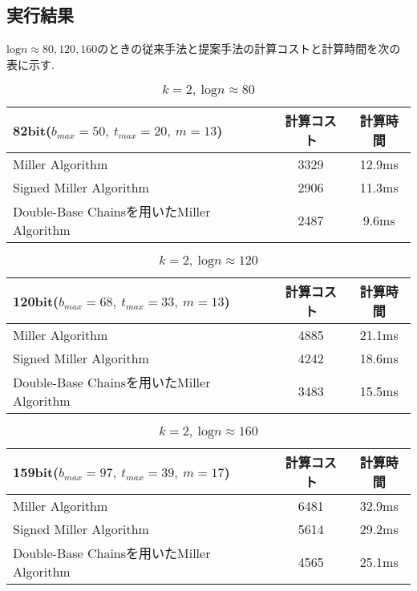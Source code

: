\subsection{実行結果}
$\mbox{log}n \approx 80,120,160$のときの従来手法と提案手法の計算コストと計算時間を次の表に示す. \\
\begin{table}[htb]
 \begin{center}
  \begin{tabular}{|l|c|c|}
  \hline
  82bit($b_{max} = 50,\ t_{max} = 20,\ m = 13$) & 計算コスト& 計算時間\\
  \hline
  Miller Algorithm & 3329 & 12.9ms \\
  \hline
  Signed Miller Algorithm & 2906 & 11.3ms \\
  \hline
  Double-Base Chainsを用いたMiller Algorithm & 2487 & 9.6ms \\
  \hline
  \end{tabular}
 \end{center}
 \caption{$k=2,\ \mbox{log}n \approx 80$}
\end{table}
\begin{table}[htb]
 \begin{center}
  \begin{tabular}{|l|c|c|}
  \hline
  120bit($b_{max} = 68,\ t_{max} = 33,\ m = 13$) & 計算コスト& 計算時間\\
  \hline
  Miller Algorithm & 4885 & 21.1ms \\
  \hline
  Signed Miller Algorithm & 4242 & 18.6ms \\
  \hline
  Double-Base Chainsを用いたMiller Algorithm & 3483 & 15.5ms \\
  \hline
  \end{tabular}
 \end{center}
 \caption{$k=2,\ \mbox{log}n \approx 120$}
\end{table}
\begin{table}[htb]
 \begin{center}
  \begin{tabular}{|l|c|c|}
  \hline
  159bit($b_{max} = 97,\ t_{max} = 39,\ m = 17$) & 計算コスト& 計算時間\\
  \hline
  Miller Algorithm & 6481 & 32.9ms \\
  \hline
  Signed Miller Algorithm & 5614 & 29.2ms \\
  \hline
  Double-Base Chainsを用いたMiller Algorithm & 4565 & 25.1ms \\
  \hline
  \end{tabular}
 \end{center}
 \caption{$k=2,\ \mbox{log}n \approx 160$}
\end{table}
